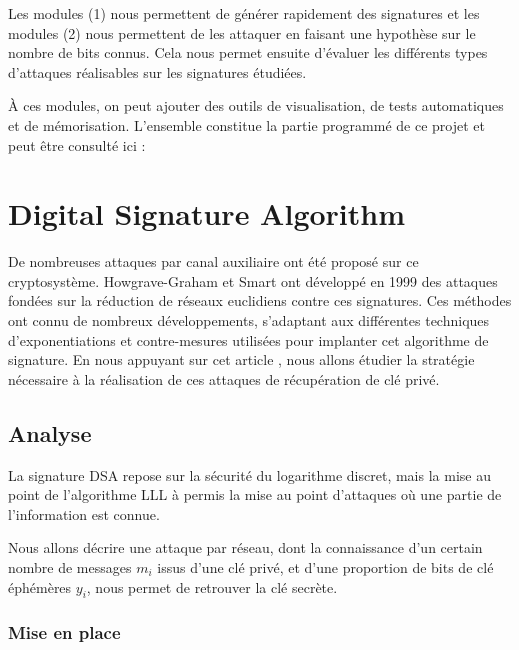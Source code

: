\documentclass{backend}
\begin{document}
Les modules (1) nous permettent de générer rapidement des signatures et les modules (2) nous permettent de les attaquer en faisant une hypothèse sur le nombre de bits connus. Cela nous permet ensuite d'évaluer les différents types d'attaques réalisables sur les signatures étudiées.


À ces modules, on peut ajouter des outils de visualisation, de tests automatiques et de mémorisation. L'ensemble constitue la partie programmé de ce projet et peut être consulté ici :


%
%


\newpage
\section{Digital Signature Algorithm}

De nombreuses attaques par canal auxiliaire ont été proposé sur ce cryptosystème. Howgrave-Graham et Smart ont développé en 1999 \cite{latAtk} des attaques fondées sur la réduction de réseaux euclidiens contre ces signatures. Ces méthodes ont connu de nombreux développements, s’adaptant aux différentes techniques d’exponentiations et contre-mesures utilisées pour implanter cet algorithme de signature. En nous appuyant sur cet article , nous allons étudier la stratégie nécessaire à la réalisation de ces attaques de récupération de clé privé.

\subsection{Analyse}\label{Analyse}

La signature DSA repose sur la sécurité du logarithme discret, mais la mise au point de l'algorithme LLL \cite{lll} à permis la mise au point d'attaques où une partie de l'information est connue.\medbreak

Nous allons décrire une attaque par réseau, dont la connaissance d'un certain nombre de messages $m_{i}$ issus d'une clé privé, et d'une proportion de bits de clé éphémères $y_{i}$, nous permet de retrouver la clé secrète.

\subsubsection{Mise en place}
\end{document}
